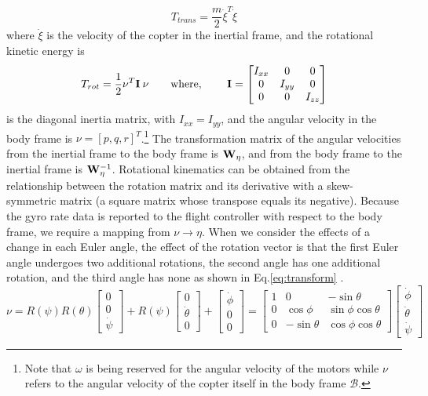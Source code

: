 \documentclass[11pt]{ucthesis}
\begin{document}
\begin{equation}
T_{trans} = \frac{m}{2}\dot{\xi}^T\dot{\xi}
\end{equation}
where $\dot{\xi}$ is the velocity of the copter in the inertial frame,
\noindent
and the rotational kinetic energy is
\begin{equation}
T_{rot} = \frac{1}{2}\nu^T\bold{I}\:\nu\qquad \text{where, }\qquad
\bold{I} = \begin{bmatrix}
I_{xx} & 0 & 0\\
0 & I_{yy} & 0\\
0 & 0 & I_{zz}
\end{bmatrix}
\end{equation}
\noindent
is the diagonal inertia matrix, with $I_{xx}=I_{yy}$, and the angular velocity in the body frame is $\nu =[p,q,r]^T$.\footnote{Note that $\omega$ is being reserved for the angular velocity of the motors while $\nu$ refers to the angular velocity of the copter itself in the body frame $\mathscr{B}$.} 
\noindent
The transformation matrix of the angular velocities from the inertial frame to the body frame is $\bold{W}_{\eta}$, and from the body frame to the inertial frame is $\bold{W}_{\eta}^{-1}$. Rotational kinematics can be obtained from the relationship between the rotation matrix and its derivative with a skew-symmetric matrix (a square matrix whose transpose equals its negative)\cite{raffo2010integral}. Because the gyro rate data is reported to the flight controller with respect to the body frame,  we require a mapping from $\nu \rightarrow \eta$. When we consider the effects of a change in each Euler angle, the effect of the rotation vector is that the first Euler angle undergoes two additional rotations, the second angle has one additional rotation, and the third angle has none as shown in Eq.\ref{eq:transform} \cite{opencoursewarekinematics}.
\begin{equation}\label{eq:transform}
\nu = R(\psi)R(\theta) \begin{bmatrix}
			0\\
			0 \\
			\dot{\psi}  
			\end{bmatrix} + 
			R(\psi)   \begin{bmatrix}
				0\\
				\dot{\theta} \\
				0  
				\end{bmatrix} + 
						\begin{bmatrix}
					\dot{\phi}\\
					0\\
					0  
					\end{bmatrix} 	=\begin{bmatrix}
					1 & 0 & -\sin\theta\\
					0 & \cos\phi & \sin\phi\cos\theta\\
					0 & -\sin\theta & \cos\phi\cos\theta
					\end{bmatrix} \begin{bmatrix}
					\dot{\phi}\\
					\dot{\theta}\\
					\dot{\psi}
					\end{bmatrix}
\end{equation}
\end{document}
